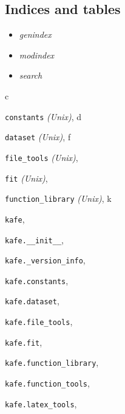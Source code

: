 \documentclass[a4paper,10pt,english]{sphinxmanual}
\begin{document}
\subsection{Indices and tables}
\label{index:indices-and-tables}\begin{itemize}
\item {} 
\emph{genindex}

\item {} 
\emph{modindex}

\item {} 
\emph{search}

\end{itemize}


\renewcommand{\indexname}{Python Module Index}
\begin{theindex}
\def\bigletter#1{{\Large\sffamily#1}\nopagebreak\vspace{1mm}}
\bigletter{c}
\item {\texttt{constants}} \emph{(Unix)}, \pageref{index:module-constants}
\indexspace
\bigletter{d}
\item {\texttt{dataset}} \emph{(Unix)}, \pageref{index:module-dataset}
\indexspace
\bigletter{f}
\item {\texttt{file\_tools}} \emph{(Unix)}, \pageref{index:module-file_tools}
\item {\texttt{fit}} \emph{(Unix)}, \pageref{index:module-fit}
\item {\texttt{function\_library}} \emph{(Unix)}, \pageref{index:module-function_library}
\indexspace
\bigletter{k}
\item {\texttt{kafe}}, \pageref{index:module-kafe}
\item {\texttt{kafe.\_\_init\_\_}}, \pageref{index:module-kafe.__init__}
\item {\texttt{kafe.\_version\_info}}, \pageref{index:module-kafe._version_info}
\item {\texttt{kafe.constants}}, \pageref{index:module-kafe.constants}
\item {\texttt{kafe.dataset}}, \pageref{index:module-kafe.dataset}
\item {\texttt{kafe.file\_tools}}, \pageref{index:module-kafe.file_tools}
\item {\texttt{kafe.fit}}, \pageref{index:module-kafe.fit}
\item {\texttt{kafe.function\_library}}, \pageref{index:module-kafe.function_library}
\item {\texttt{kafe.function\_tools}}, \pageref{index:module-kafe.function_tools}
\item {\texttt{kafe.latex\_tools}}, \pageref{index:module-kafe.latex_tools}

\end{theindex}
\end{document}
